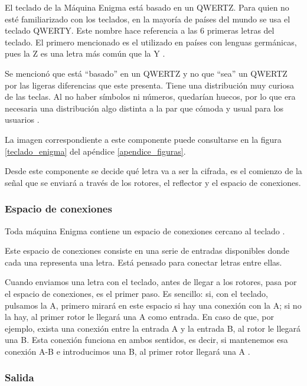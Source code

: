 El teclado de la Máquina Enigma está basado en un QWERTZ. Para quien no esté familiarizado con los teclados, en la mayoría de países del mundo se usa el teclado QWERTY. Este nombre hace referencia a las 6 primeras letras del teclado. El primero mencionado es el utilizado en países con lenguas germánicas, pues la Z es una letra más común que la Y \cite{qwerty_profesionalreview}.


Se mencionó que está “basado” en un QWERTZ y no que “sea” un QWERTZ por las ligeras diferencias que este presenta. Tiene una distribución muy curiosa de las teclas. Al no haber símbolos ni números, quedarían huecos, por lo que era necesaria una distribución algo distinta a la par que cómoda y usual para los usuarios \cite{qwerty_profesionalreview}.

La imagen correspondiente a este componente puede consultarse en la figura \ref{teclado_enigma} del apéndice \ref{apendice_figuras}.

Desde este componente se decide qué letra va a ser la cifrada, es el comienzo de la señal que se enviará a través de los rotores, el reflector y el espacio de conexiones.

\subsubsection {Espacio de conexiones}

Toda máquina Enigma contiene un espacio de conexiones cercano al teclado \cite{cripta_hacker_enigma}.


Este espacio de conexiones consiste en una serie de entradas disponibles donde cada una representa una letra. Está pensado para conectar letras entre ellas.


Cuando enviamos una letra con el teclado, antes de llegar a los rotores, pasa por el espacio de conexiones, es el primer paso. Es sencillo: si, con el teclado, pulsamos la A, primero mirará en este espacio si hay una conexión con la A; si no la hay, al primer rotor le llegará una A como entrada. En caso de que, por ejemplo, exista una conexión entre la entrada A y la entrada B, al rotor le llegará una B. Esta conexión funciona en ambos sentidos, es decir, si mantenemos esa conexión A-B e introducimos una B, al primer rotor llegará una A \cite{cripta_hacker_enigma}.


\subsubsection {Salida}

